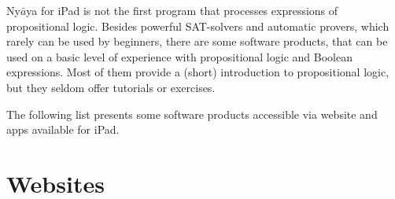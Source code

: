 
Ny$\bar{a}$ya for iPad is not the first program  that processes expressions of propositional logic. 
Besides powerful SAT-solvers and automatic provers, which rarely can be used by beginners,
there are some software products, that can be used on a basic level of experience with propositional logic and Boolean expressions.  
Most of them provide a (short) introduction to propositional logic, but they seldom offer tutorials or exercises. 	

The following list presents some software products accessible
via website and apps available for iPad.

\section{Websites}

